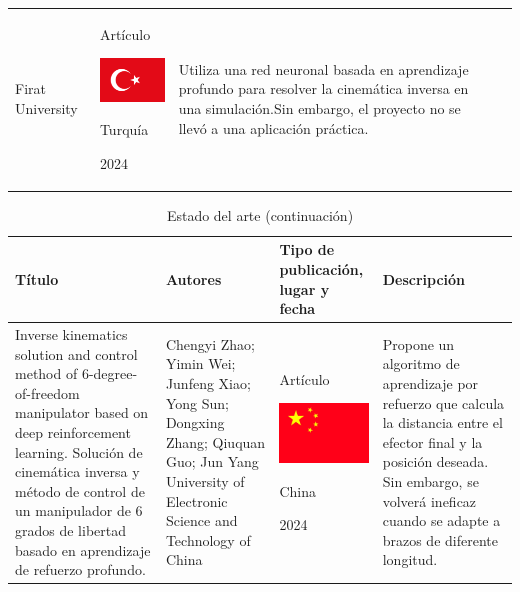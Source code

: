 \documentclass[12pt, twoside]{report}
\begin{document}
\begin{table}[htb]
\begin{tabular}{p{3.8cm}p{3.8cm}p{3.8cm}p{3.8cm}}
        Firat University & 
        \begin{center}Artículo \par \includegraphics[width=3cm]{turquia.png} \par Turquía \par 2024\end{center} & 
        Utiliza una red neuronal basada en aprendizaje profundo para resolver la cinemática inversa en una simulación.\newline\newline Sin embargo, el proyecto no se llevó a una aplicación práctica. \\
    \end{tabular}
\end{table}

\newpage
\begin{table}[htb]
    \caption{Estado del arte (continuación)}
    \centering
    \begin{tabular}{p{3.8cm}p{3.8cm}p{3.8cm}p{3.8cm}}
        \textbf{Título} & \textbf{Autores} & \textbf{Tipo de publicación, lugar y fecha} & \textbf{Descripción} \\ 
        \midrule
        Inverse kinematics solution and control method of 6-degree-of-freedom manipulator based on deep reinforcement learning. \newline\newline
        Solución de cinemática inversa y método de control de un manipulador de 6 grados de libertad basado en aprendizaje de refuerzo profundo. &  
        Chengyi Zhao; Yimin Wei; Junfeng Xiao; Yong Sun; Dongxing Zhang; Qiuquan Guo; Jun Yang \newline\newline 
        University of Electronic Science and Technology of China & 
        \begin{center}Artículo \par \includegraphics[width=3cm]{china.png} \par China \par 2024\end{center} & 
        Propone un algoritmo de aprendizaje por refuerzo que calcula la distancia entre el efector final y la posición deseada. \newline\newline Sin embargo, se volverá ineficaz cuando se adapte a brazos de diferente longitud. \\
    \end{tabular}
\end{table}
\end{document}
